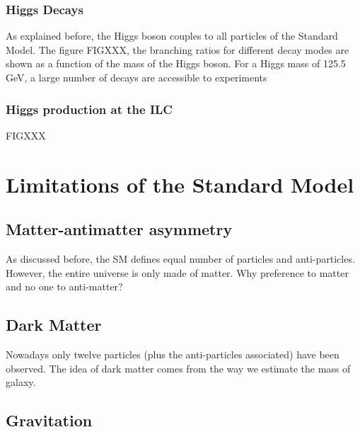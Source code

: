    \subsubsection{Higgs Decays}

   As explained before, the Higgs boson couples to all particles of the Standard Model.
   The figure FIGXXX, the branching ratios for different decay modes are shown as a function of the mass of the Higgs boson.
   For a Higgs mass of 125.5 GeV, a large number of decays are accessible to experiments

   \subsubsection{Higgs production at the ILC}

     FIGXXX
      
  \section{Limitations of the Standard Model}

    \subsection{Matter-antimatter asymmetry}

    As discussed before, the SM defines equal number of particles and anti-particles. 
    However, the entire universe is only made of matter. 
    Why preference to matter and no one to anti-matter? 

    \subsection{Dark Matter}
    
    Nowadays only twelve particles (plus the anti-particles associated) have been observed. 
    The idea of dark matter comes from the way we estimate the mass of galaxy.

    \subsection{Gravitation}         



